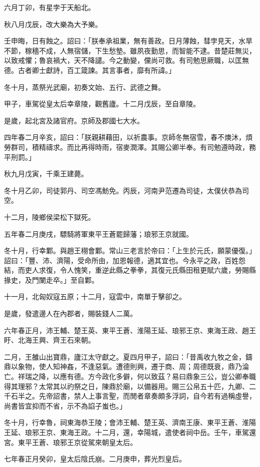 \begin{pinyinscope}
六月丁卯，有星孛于天船北。

秋八月戊辰，改大樂為大予樂。

壬申晦，日有蝕之。詔曰：「朕奉承祖業，無有善政。日月薄蝕，彗孛見天，水旱不節，稼穡不成，人無宿儲，下生愁墊。雖夙夜勤思，而智能不逮。昔楚莊無災，以致戒懼；魯哀禍大，天不降譴。今之動變，儻尚可救。有司勉思厥職，以匡無德。古者卿士獻詩，百工箴諫。其言事者，靡有所諱。」

冬十月，蒸祭光武廟，初奏文始、五行、武德之舞。

甲子，車駕從皇太后幸章陵，觀舊廬。十二月戊辰，至自章陵。

是歲，起北宮及諸官府。京師及郡國七大水。

四年春二月辛亥，詔曰：「朕親耕藉田，以祈農事。京師冬無宿雪，春不燠沐，煩勞群司，積精禱求。而比再得時雨，宿麥潤澤。其賜公卿半奉。有司勉遵時政，務平刑罰。」

秋九月戊寅，千乘王建薨。

冬十月乙卯，司徒郭丹、司空馮魴免。丙辰，河南尹范遷為司徒，太僕伏恭為司空。

十二月，陵鄉侯梁松下獄死。

五年春二月庚戌，驃騎將軍東平王蒼罷歸藩；琅邪王京就國。

冬十月，行幸鄴。與趙王栩會鄴。常山三老言於帝曰：「上生於元氏，願蒙優復。」詔曰：「豐、沛、濟陽，受命所由，加恩報德，適其宜也。今永平之政，百姓怨結，而吏人求復，令人愧笑，重逆此縣之拳拳，其復元氏縣田租更賦六歲，勞賜縣掾史，及門闌走卒。」至自鄴。

十一月，北匈奴寇五原；十二月，寇雲中，南單于擊卻之。

是歲，發遣邊人在內郡者，賜裝錢人二萬。

六年春正月，沛王輔、楚王英、東平王蒼、淮陽王延、琅邪王京、東海王政、趙王盱、北海王興、齊王石來朝。

二月，王雒山出寶鼎，廬江太守獻之。夏四月甲子，詔曰：「昔禹收九牧之金，鑄鼎以象物，使人知神姦，不逢惡氣。遭德則興，遷于商、周；周德既衰，鼎乃淪亡。祥瑞之降，以應有德。方今政化多僻，何以致茲？易曰鼎象三公，豈公卿奉職得其理邪？太常其以礿祭之日，陳鼎於廟，以備器用。賜三公帛五十匹，九卿、二千石半之。先帝詔書，禁人上事言聖，而閒者章奏頗多浮詞，自今若有過稱虛譽，尚書皆宜抑而不省，示不為諂子蚩也。」

冬十月，行幸魯，祠東海恭王陵；會沛王輔、楚王英、濟南王康、東平王蒼、淮陽王延、琅邪王京、東海王政。十二月，還，幸陽城，遣使者祠中岳。壬午，車駕還宮。東平王蒼、琅邪王京從駕來朝皇太后。

七年春正月癸卯，皇太后陰氏崩。二月庚申，葬光烈皇后。


\end{pinyinscope}
